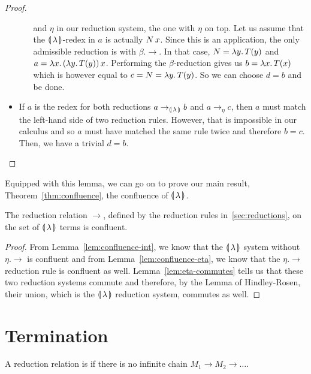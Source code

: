 \begin{proof}
\begin{itemize}
\begin{itemize}
      and $\eta$ in our reduction system, the one with $\eta$ on top. Let
      us assume that the $\llparenthesis \, \lambda \, \rrparenthesis$-redex in $a$ is actually
      $N\,x$. Since this is an application, the only admissible
      reduction is with $\beta.\to$. In that case, $N = \lambda y.\, T(y)$ and
      $a = \lambda x.\, (\lambda y.\, T(y))\,x$. Performing the
      $\beta$-reduction gives us $b = \lambda x.\, T(x)$ which is however equal
      to $c = N = \lambda y.\, T(y)$. So we can choose $d = b$ and be done.
    \end{itemize}
  \item If $a$ is the redex for both reductions $a \to_{\llparenthesis \, \lambda \, \rrparenthesis} b$ and
    $a \to_\eta c$, then $a$ must match the left-hand side of two reduction
    rules. However, that is impossible in our calculus and so $a$ must have
    matched the same rule twice and therefore $b = c$. Then, we have a
    trivial $d = b$.
  \end{itemize}
\end{proof}

Equipped with this lemma, we can go on to prove our main result,
Theorem~\ref{thm:confluence}, the confluence of $\llparenthesis \, \lambda \, \rrparenthesis$.

\begin{theorem}\label{thm:confluence}
  
  The reduction relation $\to$, defined by the reduction rules
  in~\ref{sec:reductions}, on the set of $\llparenthesis \, \lambda \, \rrparenthesis$ terms is
  confluent.
\end{theorem}

\begin{proof}
  From Lemma~\ref{lem:confluence-int}, we know that the $\llparenthesis \, \lambda \, \rrparenthesis$
  system without $\eta.\to$ is confluent and from
  Lemma~\ref{lem:confluence-eta}, we know that the $\eta.\to$ reduction
  rule is confluent as well. Lemma~\ref{lem:eta-commutes} tells us that
  these two reduction systems commute and therefore, by the Lemma of
  Hindley-Rosen, their union, which is the $\llparenthesis \, \lambda \, \rrparenthesis$ reduction
  system, commutes as well.
\end{proof}


\section{Termination}
\label{sec:termination}

\begin{definition}
  A reduction relation is  if there is no infinite chain
  $M_1 \to M_2 \to \ldots$.
\end{definition}

